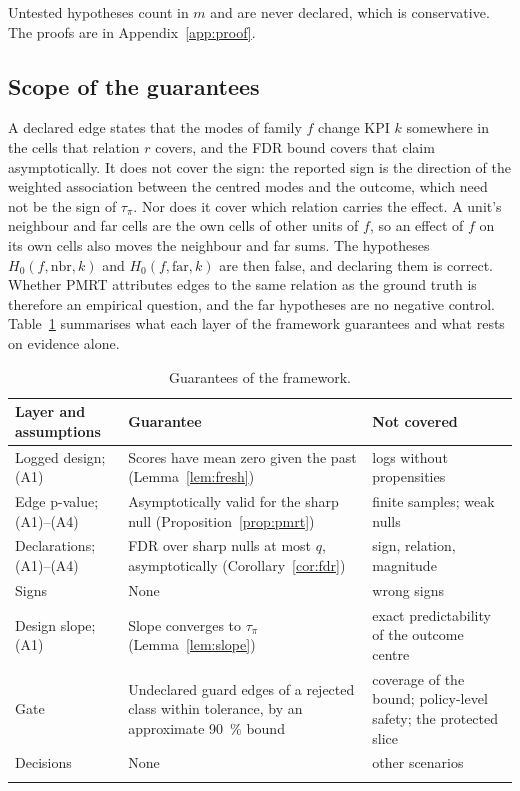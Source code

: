 Untested hypotheses count in $m$ and are never declared, which is conservative. The proofs are in
Appendix~\ref{app:proof}.

\subsection{Scope of the guarantees}
\label{sec:reading}

A declared edge states that the modes of family $f$ change KPI $k$ somewhere in the cells that relation $r$ covers,
and the FDR bound covers that claim asymptotically. It does not cover the sign: the reported sign is the direction of
the weighted association between the centred modes and the outcome, which need not be the sign of $\tau_{\pi}$. Nor
does it cover which relation carries the effect. A unit's neighbour and far cells are the own cells of other units of
$f$, so an effect of $f$ on its own cells also moves the neighbour and far sums. The hypotheses $H_0(f, \text{nbr}, k)$ and
$H_0(f, \text{far}, k)$ are then false, and declaring them is correct. Whether PMRT attributes edges to the same
relation as the ground truth is therefore an empirical question, and the far hypotheses are no negative control.
Table~\ref{tab:guarantees} summarises what each layer of the framework guarantees and what rests on evidence alone.

\begin{table}[tbp]
\caption{Guarantees of the framework.}
\label{tab:guarantees}
\footnotesize
\setlength{\tabcolsep}{3pt}
\begin{tabular*}{\textwidth}{@{\extracolsep{\fill}}>{\raggedright}p{}>{\raggedright}p{}>{\raggedright\arraybackslash}p{}@{}}
\toprule
Layer and assumptions & Guarantee & Not covered \\
\midrule
Logged design; (A1) & Scores have mean zero given the past (Lemma~\ref{lem:fresh}) & logs without propensities \\
Edge p-value; (A1)--(A4) & Asymptotically valid for the sharp null (Proposition~\ref{prop:pmrt}) & finite samples; weak nulls \\
Declarations; (A1)--(A4) & FDR over sharp nulls at most $q$, asymptotically (Corollary~\ref{cor:fdr}) & sign, relation, magnitude \\
Signs & None & wrong signs \\
Design slope; (A1) & Slope converges to $\tau_{\pi}$ (Lemma~\ref{lem:slope}) & exact predictability of the outcome centre \\
Gate & Undeclared guard edges of a rejected class within tolerance, by an approximate 90~\% bound & coverage of the bound; policy-level safety; the protected slice \\
Decisions & None & other scenarios \\
\botrule
\end{tabular*}
\end{table}

